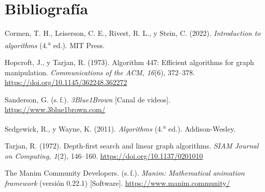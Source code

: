 \documentclass[11pt,a4paper]{article}
\numberwithin{equation}{section}
\begin{document}
\section{Bibliografía}
\begingroup
\small
\begin{list}{}{\setlength{\leftmargin}{1.5em}\setlength{\itemindent}{-1.5em}\setlength{\itemsep}{2pt}\setlength{\parsep}{0pt}\setlength{\topsep}{2pt}}
\item Cormen, T. H., Leiserson, C. E., Rivest, R. L., y Stein, C. (2022). \emph{Introduction to algorithms} (4.\textsuperscript{a} ed.). MIT Press.
\item Hopcroft, J., y Tarjan, R. (1973). Algorithm 447: Efficient algorithms for graph manipulation. \emph{Communications of the ACM, 16}(6), 372--378. \url{https://doi.org/10.1145/362248.362272}
\item Sanderson, G. (s.\,f.). \emph{3Blue1Brown} [Canal de videos]. \url{https://www.3blue1brown.com/}
\item Sedgewick, R., y Wayne, K. (2011). \emph{Algorithms} (4.\textsuperscript{a} ed.). Addison-Wesley.
\item Tarjan, R. (1972). Depth-first search and linear graph algorithms. \emph{SIAM Journal on Computing, 1}(2), 146--160. \url{https://doi.org/10.1137/0201010}
\item The Manim Community Developers. (s.\,f.). \emph{Manim: Mathematical animation framework} (versión 0.22.1) [Software]. \url{https://www.manim.community/}
\end{list}
\endgroup
\end{document}
